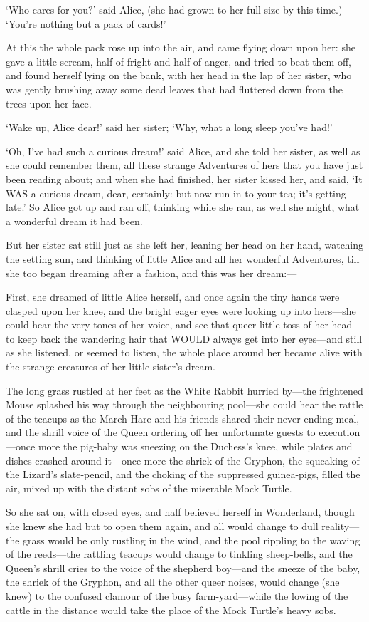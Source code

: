 \documentclass[12pt]{article}
\begin{document}
\begin{Parallel}[p]{}{}
{‘Who cares for you?’ said Alice, (she had grown to her full size by this time.) ‘You’re nothing but a pack of cards!’

At this the whole pack rose up into the air, and came flying down upon her: she gave a little scream, half of fright and half of anger, and tried to beat them off, and found herself lying on the bank, with her head in the lap of her sister, who was gently brushing away some dead leaves that had fluttered down from the trees upon her face.

‘Wake up, Alice dear!’ said her sister; ‘Why, what a long sleep you’ve had!’

‘Oh, I’ve had such a curious dream!’ said Alice, and she told her sister, as well as she could remember them, all these strange Adventures of hers that you have just been reading about; and when she had finished, her sister kissed her, and said, ‘It WAS a curious dream, dear, certainly: but now run in to your tea; it’s getting late.’ So Alice got up and ran off, thinking while she ran, as well she might, what a wonderful dream it had been.

But her sister sat still just as she left her, leaning her head on her hand, watching the setting sun, and thinking of little Alice and all her wonderful Adventures, till she too began dreaming after a fashion, and this was her dream:—

First, she dreamed of little Alice herself, and once again the tiny hands were clasped upon her knee, and the bright eager eyes were looking up into hers—she could hear the very tones of her voice, and see that queer little toss of her head to keep back the wandering hair that WOULD always get into her eyes—and still as she listened, or seemed to listen, the whole place around her became alive with the strange creatures of her little sister’s dream.

The long grass rustled at her feet as the White Rabbit hurried by—the frightened Mouse splashed his way through the neighbouring pool—she could hear the rattle of the teacups as the March Hare and his friends shared their never-ending meal, and the shrill voice of the Queen ordering off her unfortunate guests to execution—once more the pig-baby was sneezing on the Duchess’s knee, while plates and dishes crashed around it—once more the shriek of the Gryphon, the squeaking of the Lizard’s slate-pencil, and the choking of the suppressed guinea-pigs, filled the air, mixed up with the distant sobs of the miserable Mock Turtle.

So she sat on, with closed eyes, and half believed herself in Wonderland, though she knew she had but to open them again, and all would change to dull reality—the grass would be only rustling in the wind, and the pool rippling to the waving of the reeds—the rattling teacups would change to tinkling sheep-bells, and the Queen’s shrill cries to the voice of the shepherd boy—and the sneeze of the baby, the shriek of the Gryphon, and all the other queer noises, would change (she knew) to the confused clamour of the busy farm-yard—while the lowing of the cattle in the distance would take the place of the Mock Turtle’s heavy sobs.

}
\end{Parallel}
\end{document}
